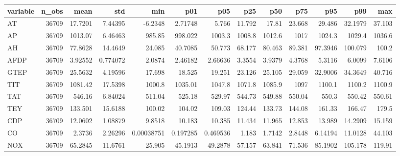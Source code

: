 \begin{tabular}{lrrrrrrrrrrrr}
\toprule
variable & n\_obs & mean & std & min & p01 & p05 & p25 & p50 & p75 & p95 & p99 & max \\
\midrule
AT & 36709 & 17.7201 & 7.44395 & -6.2348 & 2.71748 & 5.766 & 11.792 & 17.81 & 23.668 & 29.486 & 32.1979 & 37.103 \\
AP & 36709 & 1013.07 & 6.46463 & 985.85 & 998.022 & 1003.3 & 1008.8 & 1012.6 & 1017 & 1024.3 & 1029.4 & 1036.6 \\
AH & 36709 & 77.8628 & 14.4649 & 24.085 & 40.7085 & 50.773 & 68.177 & 80.463 & 89.381 & 97.3946 & 100.079 & 100.2 \\
AFDP & 36709 & 3.92552 & 0.774072 & 2.0874 & 2.46182 & 2.66636 & 3.3554 & 3.9379 & 4.3768 & 5.3116 & 6.0099 & 7.6106 \\
GTEP & 36709 & 25.5632 & 4.19596 & 17.698 & 18.525 & 19.251 & 23.126 & 25.105 & 29.059 & 32.9006 & 34.3649 & 40.716 \\
TIT & 36709 & 1081.42 & 17.5398 & 1000.8 & 1035.01 & 1047.8 & 1071.8 & 1085.9 & 1097 & 1100.1 & 1100.2 & 1100.9 \\
TAT & 36709 & 546.16 & 6.84024 & 511.04 & 525.18 & 529.97 & 544.73 & 549.88 & 550.04 & 550.3 & 550.42 & 550.61 \\
TEY & 36709 & 133.501 & 15.6188 & 100.02 & 104.02 & 109.03 & 124.44 & 133.73 & 144.08 & 161.33 & 166.47 & 179.5 \\
CDP & 36709 & 12.0602 & 1.08879 & 9.8518 & 10.183 & 10.385 & 11.434 & 11.965 & 12.853 & 13.989 & 14.2909 & 15.159 \\
CO & 36709 & 2.3736 & 2.26296 & 0.00038751 & 0.197285 & 0.469536 & 1.183 & 1.7142 & 2.8448 & 6.14194 & 11.0128 & 44.103 \\
NOX & 36709 & 65.2845 & 11.6761 & 25.905 & 45.1913 & 49.2878 & 57.157 & 63.841 & 71.536 & 85.1902 & 105.178 & 119.91 \\
\bottomrule
\end{tabular}

